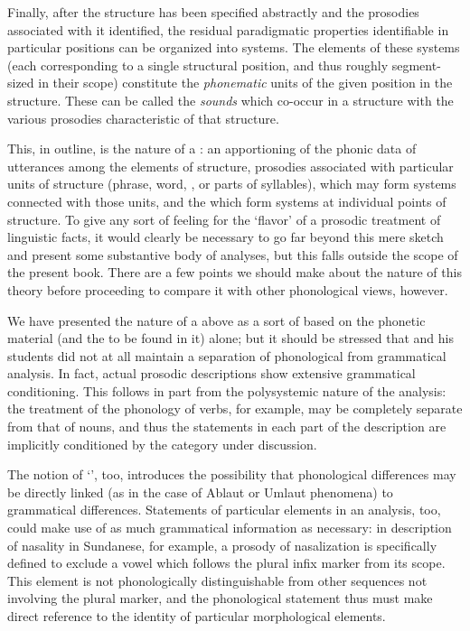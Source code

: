 Finally, after the structure has been specified abstractly and the
prosodies associated with it identified, the residual paradigmatic
properties identifiable in particular positions can be organized into
systems. The elements of these systems (each corresponding to a single
structural position, and thus roughly segment-sized in their scope)
constitute the \emph{phonematic} units of the given position in the
structure. These  can be called the \emph{sounds}
which co-occur in a structure with the various prosodies
characteristic of that structure.

This, in outline, is the nature of a : an
apportioning of the phonic data of utterances among the elements of
structure, prosodies associated with particular units of structure
(phrase, word, , or parts of syllables), which may form
systems connected with those units, and the  which
form systems at individual points of structure. To give any sort of
feeling for the `flavor' of a prosodic treatment of linguistic facts,
it would clearly be necessary to go far beyond this mere sketch and
present some substantive body of analyses, but this falls outside the
scope of the present book. There are a few points we should make
about the nature of this theory before proceeding to compare it with
other phonological views, however.

We have presented the nature of a  above as a sort of
 based on the phonetic material (and the  to be
found in it) alone; but it should be stressed that {\Firth} and his
students did not at all maintain a separation of phonological from
grammatical analysis. In fact, actual prosodic descriptions show
extensive grammatical conditioning. This follows in part from the
polysystemic nature of the analysis: the treatment of the phonology of
verbs, for example, may be completely separate from that of nouns, and
thus the statements in each part of the description are implicitly
conditioned by the category under discussion.

The notion of `', too, introduces the possibility that
phonological differences may be directly linked (as in the case of
Ablaut or Umlaut phenomena) to grammatical differences. Statements of
particular elements in an analysis, too, could make use of as much
grammatical information as necessary: in
 description of nasality in
Sundanese, for example, a prosody of nasalization is specifically
defined to exclude a vowel which follows the plural infix marker from
its scope. This element is not phonologically distinguishable from
other sequences not involving the plural marker, and the phonological
statement thus must make direct reference to the identity of
particular morphological elements.

